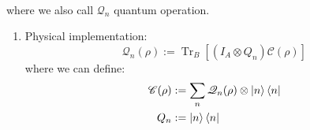\documentclass[11pt,a4paper]{article}%
\numberwithin{equation}{section}
\newcommand{\Tr}{\operatorname{Tr}}
\begin{document}
\begin{enumerate}
\begin{align}
    \end{align}
    where we also call $\mathscr Q_n$ quantum operation.
    \begin{enumerate}
        \item Physical implementation: 
        \begin{equation}
            \mathscr Q_n(\rho) := \Tr_B [(I_A\otimes Q_n)\mathscr C(\rho)]
        \end{equation}
        where we can define:
        \begin{align}
            \mathscr C (\rho) &:= \sum_n \mathscr Q_n(\rho)\otimes\ket n\bra n \\
            Q_n &:= \ket n\bra n
        \end{align}
    \end{enumerate}
\end{enumerate}
\end{document}
